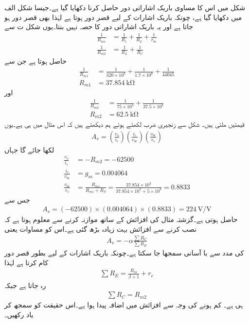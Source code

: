 شکل   میں اس کا مساوی باریک اشاراتی دور حاصل کرنا دکھایا گیا ہے۔جیسا شکل  الف میں دکھایا گیا ہے، چونکہ  باریک اشارات کے لیے قصر دور ہوتا ہے لہٰذا   بھی قصر دور ہو جاتا ہے اور یہ باریک اشاراتی دور کا حصہ نہیں بنتا۔یوں شکل  ت سے
\begin{align*}
\frac{1}{R_{m1}}&=\frac{1}{R_1}+\frac{1}{R_2}+\frac{1}{r_{be}}\\
\frac{1}{R_{m2}}&=\frac{1}{R_L}+\frac{1}{R_C}
\end{align*}
حاصل ہوتا ہے جن سے
\begin{align*}
\frac{1}{R_{m1}}&=\frac{1}{320 \times 10^3}+\frac{1}{1.7 \times 10^6}+\frac{1}{44045}\\
R_{m1}&=\SI{37.854}{\kilo \ohm}
\end{align*}
اور
\begin{align*}
\frac{1}{R_{m2}}&=\frac{1}{75 \times 10^3}+\frac{1}{37.5 \times 10^3}\\
R_{m2}&=\SI{62.5}{\kilo \ohm}
\end{align*}
قیمتیں ملتی ہیں۔
شکل سے زنجیری ضرب لکھتے ہوئے ہم دیکھتے ہیں کہ اس مثال میں  ہی  ہے۔یوں
\begin{align*}
A_v=\left(\frac{v_o}{i_c} \right ) \left(\frac{i_c}{v_{be}} \right ) \left(\frac{v_{be}}{v_s} \right )
\end{align*}
لکھا جائے گا جہاں
\begin{align*}
\frac{v_o}{i_c}&=-R_{m2}=\num{-62500}\\
\frac{i_c}{v_{be}}&=g_m =\num{0.004064}\\
\frac{v_{be}}{v_s}&=\frac{R_{m1}}{R_{m1}+R_S}=\frac{37.854 \times 10^3}{37.854 \times 10^3+5 \times 10^3}=\num{0.8833}
\end{align*}
جس سے
\begin{align*}
A_v=(-62500) \times (0.004064) \times (0.8833)=\SI{224}{\volt \per \volt}
\end{align*}
حاصل ہوتی ہے۔گزشتہ مثال کی افزائش کے ساتھ موازنہ کرنے سے معلوم ہوتا ہے کہ    نصب کرنے سے افزائش بہت زیادہ بڑھ گئی ہے۔اس کو مساوات   یعنی
\begin{align*}
A_v = -\alpha \frac{\sum R_C}{\sum R_E}
\end{align*}
کی مدد سے با آسانی سمجھا جا سکتا ہے۔چونکہ باریک اشارات کے لیے  بطور قصر دور کام کرتا ہے لہٰذا
\begin{align*}
\sum{R_E}=\frac{R_{th}}{\beta+1}+r_e
\end{align*}
رہ جاتا ہے جبکہ
\begin{align*}
\sum{R_C}=R_{m2}
\end{align*} 
ہی ہے۔  کم ہونے کی وجہ سے افزائش میں اضافہ پیدا ہوا ہے۔اس حقیقت کو سمجھ کر یاد رکھیں۔

